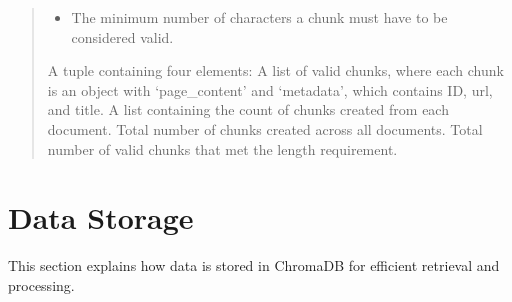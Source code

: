 \documentclass[letterpaper,10pt,english,openany,oneside]{sphinxmanual}
\begin{document}
\begin{fulllineitems}
\begin{quote}
\begin{description}
\begin{itemize}
\item {} 
\sphinxAtStartPar
{} \textendash{} The minimum number of characters a chunk must have to be considered valid.

\end{itemize}

\sphinxAtStartPar
A tuple containing four elements:
\sphinxhyphen{} A list of valid chunks, where each chunk is an object with ‘page\_content’ and ‘metadata’, which contains ID, url, and title.
\sphinxhyphen{} A list containing the count of chunks created from each document.
\sphinxhyphen{} Total number of chunks created across all documents.
\sphinxhyphen{} Total number of valid chunks that met the length requirement.

\end{description}\end{quote}

\end{fulllineitems}


\sphinxstepscope


\chapter{Data Storage}
\label{\detokenize{data_storage:data-storage}}\label{\detokenize{data_storage::doc}}
\sphinxAtStartPar
This section explains how data is stored in ChromaDB for efficient retrieval and processing.
\label{\detokenize{data_storage:module-tools.pipeline}}
\end{document}
